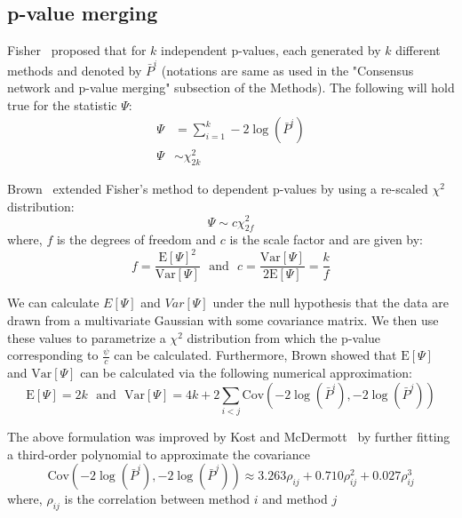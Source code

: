 \documentclass[letterpaper,12pt]{article}
\begin{document}
  \subsection*{p-value merging}

  Fisher~\cite{fisher_224a_1948} proposed that for $k$ independent p-values, each generated by $k$ different methods and denoted by $\bar{P}^i$ (notations are same as used in the "Consensus network and p-value merging" subsection of the Methods).
  The following will hold true for the statistic $\Psi$:
  \begin{equation*}
    \begin{aligned}
      \Psi &= \sum_{i=1}^k -2 \log \left( \bar{P}^i \right) \\
        \Psi &\sim \chi^2_{2k}
    \end{aligned}
  \end{equation*}

  Brown~\cite{brown_400_1975} extended Fisher's method to dependent p-values by using a re-scaled $\chi^2$ distribution:
  \begin{equation*}
    \Psi \sim c \chi^2_{2f}
  \end{equation*}
  where, $f$ is the degrees of freedom and $c$ is the scale factor and are given by:
  \begin{equation*}
    f = \frac{\mathrm{E}[\Psi]^2}{\mathrm{Var}[\Psi]} ~~~\text{and}~~~ c = \frac{\mathrm{Var}[\Psi]}{2\mathrm{E}[\Psi]} = \frac{k}{f}
  \end{equation*}

  We can calculate $E[\Psi]$ and $Var[\Psi]$ under the null hypothesis that the data are drawn from a multivariate Gaussian with some covariance matrix.
  We then use these values to parametrize a $\chi^2$ distribution from which the p-value corresponding to $\frac{\psi}{c}$ can be calculated.
  Furthermore, Brown showed that $\mathrm{E}[\Psi]$ and $\mathrm{Var}[\Psi]$ can be calculated via the following numerical approximation:
  \begin{equation*}
    \mathrm{E}[\Psi] = 2k ~~~\text{and}~~~ \mathrm{Var}[\Psi] = 4k + 2\sum_{i<j} \mathrm{Cov}\left( -2\log(\bar{P}^i), -2\log(\bar{P}^j) \right)
  \end{equation*}

  The above formulation was improved by Kost and McDermott~\cite{kost_combining_2002} by further fitting a third-order polynomial to approximate the covariance
  \begin{equation}
    \mathrm{Cov}\left( -2\log(\bar{P}^i), -2\log(\bar{P}^j) \right) \approx 3.263 \rho_{ij} + 0.710 \rho_{ij}^2 + 0.027 \rho_{ij}^3
    \label{eqn:suppl_covariance-pvalues}
  \end{equation}
  where, $\rho_{ij}$ is the correlation between method $i$ and method $j$
\end{document}
